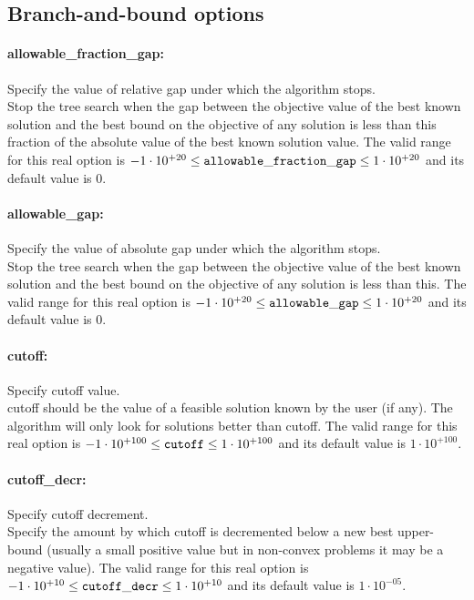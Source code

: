 \subsection{Branch-and-bound options}
\label{sec:Branch-and-boundoptions}
\paragraph{allowable\_fraction\_gap:}\label{opt:allowable_fraction_gap} Specify the value of relative gap under which the algorithm stops. \\
 Stop the tree search when the gap between the objective value of the best known solution and the best bound on the objective of any solution is less than this fraction of the absolute value of the best known solution value. The valid range for this real option is 
$-1 \cdot 10^{+20} \le {\tt allowable\_fraction\_gap } \le 1 \cdot 10^{+20}$
and its default value is $0$.


\paragraph{allowable\_gap:}\label{opt:allowable_gap} Specify the value of absolute gap under which the algorithm stops. \\
 Stop the tree search when the gap between the objective value of the best known solution and the best bound on the objective of any solution is less than this. The valid range for this real option is 
$-1 \cdot 10^{+20} \le {\tt allowable\_gap } \le 1 \cdot 10^{+20}$
and its default value is $0$.


\paragraph{cutoff:}\label{opt:cutoff} Specify cutoff value. \\
 cutoff should be the value of a feasible solution known by the user (if any). The algorithm will only look for solutions better than cutoff. The valid range for this real option is 
$-1 \cdot 10^{+100} \le {\tt cutoff } \le 1 \cdot 10^{+100}$
and its default value is $1 \cdot 10^{+100}$.


\paragraph{cutoff\_decr:}\label{opt:cutoff_decr} Specify cutoff decrement. \\
 Specify the amount by which cutoff is decremented below a new best upper-bound (usually a small positive value but in non-convex problems it may be a negative value). The valid range for this real option is 
$-1 \cdot 10^{+10} \le {\tt cutoff\_decr } \le 1 \cdot 10^{+10}$
and its default value is $1 \cdot 10^{-05}$.


